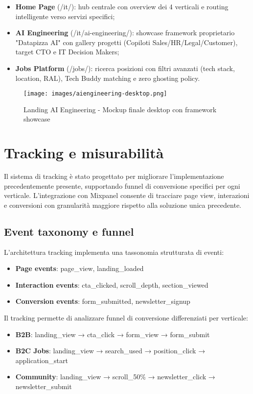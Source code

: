 \begin{itemize}
  \item \textbf{Home Page} (/it/): hub centrale con overview dei 4 verticali e routing 
  intelligente verso servizi specifici;
  \item \textbf{AI Engineering} (/it/ai-engineering/): showcase framework proprietario 
  "Datapizza AI" con gallery progetti (Copiloti Sales/HR/Legal/Customer), target CTO 
  e IT Decision Makers;
  \item \textbf{Jobs Platform} (/jobs/): ricerca posizioni con filtri avanzati 
  (tech stack, location, RAL), Tech Buddy matching e zero ghosting policy.
\end{itemize}

\begin{figure}[h]
  \centering
  \texttt{[image: images/aiengineering-desktop.png]}
  \caption{Landing AI Engineering - Mockup finale desktop con framework showcase}
  \label{fig:ai-engineering}
\end{figure}

\section{Tracking e misurabilità}
Il sistema di tracking è stato progettato per migliorare l'implementazione 
precedentemente presente, supportando funnel di conversione specifici per ogni 
verticale. L'integrazione con Mixpanel consente di tracciare page view, 
interazioni e conversioni con granularità maggiore rispetto alla soluzione unica 
precedente.

\subsection{Event taxonomy e funnel}
L'architettura tracking implementa una tassonomia strutturata di eventi:
\begin{itemize}
  \item \textbf{Page events}: page\_view, landing\_loaded
  \item \textbf{Interaction events}: cta\_clicked, scroll\_depth, section\_viewed
  \item \textbf{Conversion events}: form\_submitted, newsletter\_signup
\end{itemize}

Il tracking permette di analizzare funnel di conversione differenziati per verticale:
\begin{itemize}
  \item \textbf{B2B}: landing\_view → cta\_click → form\_view → form\_submit
  \item \textbf{B2C Jobs}: landing\_view → search\_used → position\_click → application\_start
  \item \textbf{Community}: landing\_view → scroll\_50\% → newsletter\_click → newsletter\_submit
\end{itemize}


